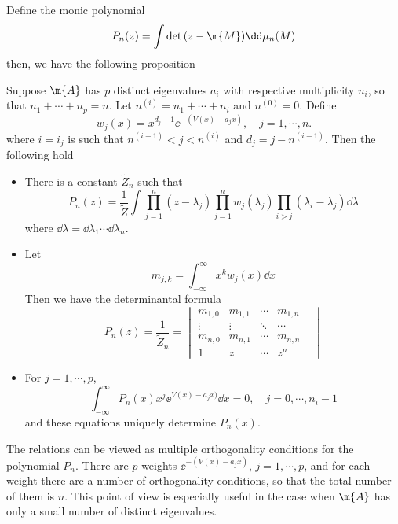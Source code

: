 Define the monic polynomial
\begin{equation}
	P_n(z) = \int \det{(z - \m{M})} \dd \mu_n(M)	
\end{equation}
then, we have the following proposition
\begin{prop} Suppose $\m{A}$ has $p$ distinct eigenvalues $a_i$ with respective multiplicity $n_i$, so that $n_1 + \cdots + n_p = n$. Let $n^{(i)} = n_1 + \cdots + n_i$ and $n^{(0)} = 0$. Define
	\begin{equation}
		w_j(x) = x^{d_j -1} \ee^{-(V(x) - a_j x)}, \quad j = 1, \cdots, n.
	\end{equation}
	where $i = i_j$ is such that $n^{(i-1)} < j < n^{(i)}$ and $d_j = j - n^{(i-1)}$. Then the following hold
	\begin{itemize}
		\item There is a constant $\tilde{Z}_n$ such that
		\begin{equation}
			P_n(z) = \frac{1}{\tilde{Z}} \int \prod_{j=1}^{n} (z - \lambda_j) \prod_{j=1}^{n} w_j(\lambda_j) \prod_{i > j} (\lambda_i - \lambda_j) \dd \lambda
		\end{equation}
		where $\dd \lambda = \dd \lambda_1 \cdots \dd \lambda_n$.
		\item Let 
		\begin{equation}
			m_{j,k} = \int_{-\infty}^{\infty} x^k w_j(x) \dd x
		\end{equation} 
		Then we have the determinantal formula
		\begin{equation}
			P_n(z) = \frac{1}{\tilde{Z}_n} = 
			\begin{vmatrix}
				m_{1,0} & m_{1,1} & \cdots & m_{1,n}\\
				\vdots & \vdots & \ddots & \cdots \\
				m_{n,0} & m_{n,1} & \cdots & m_{n,n} & \\
				1 & z & \cdots & z^n
			\end{vmatrix}
		\end{equation}
		\item For $j = 1, \cdots, p$,
		\begin{equation}
			\int_{-\infty}^{\infty} P_n(x) x^j  \ee^{V(x) - a_j x)} \dd x = 0, \quad j = 0, \cdots, n_i-1
		\end{equation}
		and these equations uniquely determine $P_n(x)$.
	\end{itemize}
\end{prop}

The relations can be viewed as multiple orthogonality conditions for the polynomial $P_n$. There are $p$ weights $\ee^{-(V (x)-a_jx)}$, $j = 1, \cdots , p$, and for each weight there are a number of orthogonality conditions, so that the total number of them is $n$. This point of view is especially useful in the case when $\m{A}$ has only a small number of distinct eigenvalues. 

